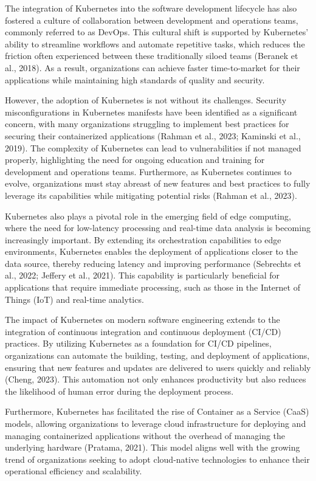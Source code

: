 The integration of Kubernetes into the software development lifecycle has also fostered a culture of collaboration between development and operations teams, commonly referred to as DevOps. This cultural shift is supported by Kubernetes' ability to streamline workflows and automate repetitive tasks, which reduces the friction often experienced between these traditionally siloed teams (Beranek et al., 2018). As a result, organizations can achieve faster time-to-market for their applications while maintaining high standards of quality and security.

However, the adoption of Kubernetes is not without its challenges. Security misconfigurations in Kubernetes manifests have been identified as a significant concern, with many organizations struggling to implement best practices for securing their containerized applications (Rahman et al., 2023; Kaminski et al., 2019). The complexity of Kubernetes can lead to vulnerabilities if not managed properly, highlighting the need for ongoing education and training for development and operations teams. Furthermore, as Kubernetes continues to evolve, organizations must stay abreast of new features and best practices to fully leverage its capabilities while mitigating potential risks (Rahman et al., 2023).

Kubernetes also plays a pivotal role in the emerging field of edge computing, where the need for low-latency processing and real-time data analysis is becoming increasingly important. By extending its orchestration capabilities to edge environments, Kubernetes enables the deployment of applications closer to the data source, thereby reducing latency and improving performance (Sebrechts et al., 2022; Jeffery et al., 2021). This capability is particularly beneficial for applications that require immediate processing, such as those in the Internet of Things (IoT) and real-time analytics.

The impact of Kubernetes on modern software engineering extends to the integration of continuous integration and continuous deployment (CI/CD) practices. By utilizing Kubernetes as a foundation for CI/CD pipelines, organizations can automate the building, testing, and deployment of applications, ensuring that new features and updates are delivered to users quickly and reliably (Cheng, 2023). This automation not only enhances productivity but also reduces the likelihood of human error during the deployment process.

Furthermore, Kubernetes has facilitated the rise of Container as a Service (CaaS) models, allowing organizations to leverage cloud infrastructure for deploying and managing containerized applications without the overhead of managing the underlying hardware (Pratama, 2021). This model aligns well with the growing trend of organizations seeking to adopt cloud-native technologies to enhance their operational efficiency and scalability.

